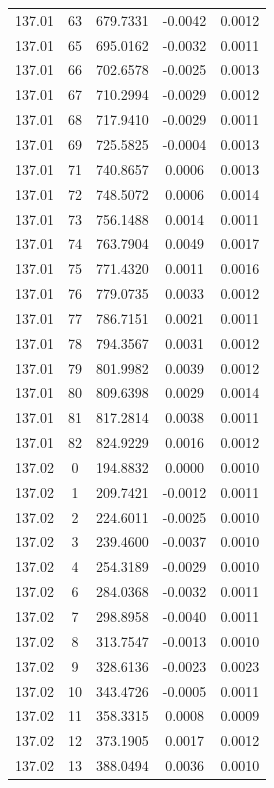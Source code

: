 {\begin{longtable}{lcccc}
137.01 & 63 & 679.7331 & -0.0042 &  0.0012 \\
137.01 & 65 & 695.0162 & -0.0032 &  0.0011 \\
137.01 & 66 & 702.6578 & -0.0025 &  0.0013 \\
137.01 & 67 & 710.2994 & -0.0029 &  0.0012 \\
137.01 & 68 & 717.9410 & -0.0029 &  0.0011 \\
137.01 & 69 & 725.5825 & -0.0004 &  0.0013 \\
137.01 & 71 & 740.8657 &  0.0006 &  0.0013 \\
137.01 & 72 & 748.5072 &  0.0006 &  0.0014 \\
137.01 & 73 & 756.1488 &  0.0014 &  0.0011 \\
137.01 & 74 & 763.7904 &  0.0049 &  0.0017 \\
137.01 & 75 & 771.4320 &  0.0011 &  0.0016 \\
137.01 & 76 & 779.0735 &  0.0033 &  0.0012 \\
137.01 & 77 & 786.7151 &  0.0021 &  0.0011 \\
137.01 & 78 & 794.3567 &  0.0031 &  0.0012 \\
137.01 & 79 & 801.9982 &  0.0039 &  0.0012 \\
137.01 & 80 & 809.6398 &  0.0029 &  0.0014 \\
137.01 & 81 & 817.2814 &  0.0038 &  0.0011 \\
137.01 & 82 & 824.9229 &  0.0016 &  0.0012 \\
137.02 & 0 & 194.8832 &  0.0000 &  0.0010 \\
137.02 & 1 & 209.7421 & -0.0012 &  0.0011 \\
137.02 & 2 & 224.6011 & -0.0025 &  0.0010 \\
137.02 & 3 & 239.4600 & -0.0037 &  0.0010 \\
137.02 & 4 & 254.3189 & -0.0029 &  0.0010 \\
137.02 & 6 & 284.0368 & -0.0032 &  0.0011 \\
137.02 & 7 & 298.8958 & -0.0040 &  0.0011 \\
137.02 & 8 & 313.7547 & -0.0013 &  0.0010 \\
137.02 & 9 & 328.6136 & -0.0023 &  0.0023 \\
137.02 & 10 & 343.4726 & -0.0005 &  0.0011 \\
137.02 & 11 & 358.3315 &  0.0008 &  0.0009 \\
137.02 & 12 & 373.1905 &  0.0017 &  0.0012 \\
137.02 & 13 & 388.0494 &  0.0036 &  0.0010 \\

\end{longtable}}
